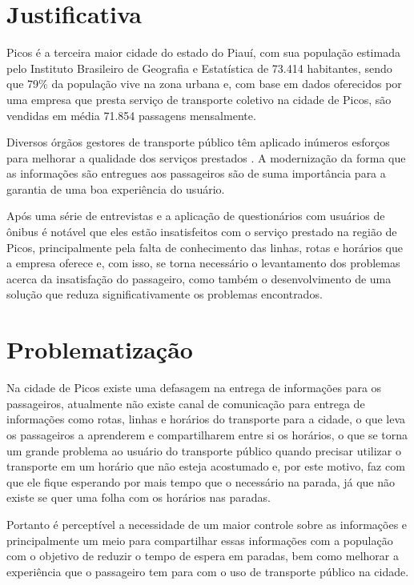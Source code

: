 \section{Justificativa}

Picos é a terceira maior cidade do estado do Piauí, com sua população estimada pelo Instituto Brasileiro de Geografia e Estatística \cite{ibge} de 73.414 habitantes, sendo que 79\% da população vive na zona urbana e, com base em dados oferecidos por uma empresa que presta serviço de transporte coletivo na cidade de Picos, são vendidas em média 71.854 passagens mensalmente.

Diversos órgãos gestores de transporte público têm aplicado inúmeros esforços para melhorar a qualidade dos serviços
prestados \cite{associacao-nacional}. A modernização da forma que as informações são entregues aos passageiros são
de suma importância para a garantia de uma boa experiência do usuário.

Após uma série de entrevistas e a aplicação de questionários com usuários de ônibus é notável que eles estão
insatisfeitos com o serviço prestado na região de Picos, principalmente pela falta de conhecimento das linhas,
rotas e horários que a empresa oferece e, com isso, se torna necessário o levantamento dos problemas acerca da
insatisfação do passageiro, como também o desenvolvimento de uma solução que reduza significativamente os
problemas encontrados.

\section{Problematização}

Na cidade de Picos existe uma defasagem na entrega de informações para os passageiros, atualmente não existe canal de comunicação para entrega de informações como rotas, linhas e horários do transporte para a cidade, o que leva os passageiros a aprenderem e compartilharem entre si os horários, o que se torna um grande problema ao usuário do transporte público quando precisar utilizar o transporte em um horário que não esteja acostumado e, por este motivo, faz com que ele fique esperando por mais tempo que o necessário na parada, já que não existe se quer uma folha com os horários nas paradas.

Portanto é perceptível a necessidade de um maior controle sobre as informações e principalmente um meio para compartilhar essas informações com a população com o objetivo de reduzir o tempo de espera em paradas, bem como melhorar a experiência que o passageiro tem para com o uso de transporte público na cidade.


